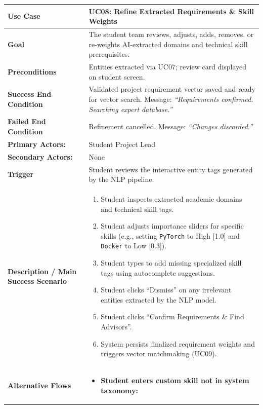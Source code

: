 \begin{table}[H]
\centering
\small
\begin{tabularx}{\textwidth}{|l|X|}
\hline
\rowcolor{lightgray!40} \textbf{Use Case} & \textbf{UC08: Refine Extracted Requirements \& Skill Weights} \\ \hline
\textbf{Goal} & The student team reviews, adjusts, adds, removes, or re-weights AI-extracted domains and technical skill prerequisites. \\ \hline
\textbf{Preconditions} & Entities extracted via UC07; review card displayed on student screen. \\ \hline
\textbf{Success End Condition} & Validated project requirement vector saved and ready for vector search. Message: \textit{``Requirements confirmed. Searching expert database.''} \\ \hline
\textbf{Failed End Condition} & Refinement cancelled. Message: \textit{``Changes discarded.''} \\ \hline
\textbf{Primary Actors:} & Student Project Lead \\
\textbf{Secondary Actors:} & None \\ \hline
\textbf{Trigger} & Student reviews the interactive entity tags generated by the NLP pipeline. \\ \hline
\textbf{Description / Main Success Scenario} &
\begin{enumerate}[leftmargin=*]
    \item Student inspects extracted academic domains and technical skill tags.
    \item Student adjusts importance sliders for specific skills (e.g., setting \texttt{PyTorch} to High [1.0] and \texttt{Docker} to Low [0.3]).
    \item Student types to add missing specialized skill tags using autocomplete suggestions.
    \item Student clicks ``Dismiss'' on any irrelevant entities extracted by the NLP model.
    \item Student clicks ``Confirm Requirements \& Find Advisors''.
    \item System persists finalized requirement weights and triggers vector matchmaking (UC09).
\end{enumerate} \\ \hline
\textbf{Alternative Flows} &
\begin{itemize}[leftmargin=*]
    \item[\textbf{3.a.}] \textbf{Student enters custom skill not in system taxonomy:}

\end{itemize}
\end{tabularx}
\end{table}
